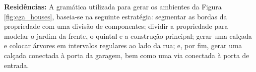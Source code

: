 \vspace{0.5cm}

\begin{figure}[h!]
	\centering
	\captionsetup{width=15cm}
	{}	
\end{figure}

\textbf{Residências:} A gramática utilizada para gerar os ambientes da Figura  \ref{fig:cga_houses}, baseia-se na seguinte estratégia: segmentar as bordas da propriedade com uma divisão de componentes; dividir a propriedade para modelar o jardim da frente, o quintal e a construção principal; gerar uma calçada e colocar árvores em intervalos regulares ao lado da rua; e, por fim, gerar uma calçada conectada à porta da garagem, bem como uma via conectada à porta de entrada.

\begin{figure}[h!]
	\centering
	\captionsetup{width=15cm}
	{}	
\end{figure}

